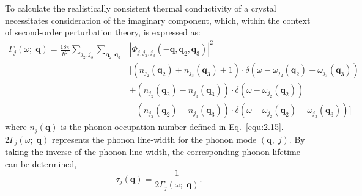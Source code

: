 To calculate the realistically consistent thermal conductivity of a crystal necessitates consideration of the imaginary component, which, within the context of second-order perturbation theory, is expressed as:
\begin{equation}
\label{equ:2.21}
    \begin{split}
        \Gamma_{j}(\omega;\;\mathbf{q}) = \frac{18\pi}{\hbar^{2}}\sum_{j_{2},j_{3}} \sum_{\mathbf{q}_{2},\mathbf{q}_{3}}&\left|\Phi_{j,j_{2},j_{3}}(-\mathbf{q}, \mathbf{q}_{2}, \mathbf{q}_{3}) \right|^{2}\\
        &\bigg[\left(n_{j_{2}}(\mathbf{q}_{2})+n_{j_{3}}(\mathbf{q}_{3})+1\right)\cdot\delta\left(\omega-\omega_{j_{2}}(\mathbf{q}_{2})-\omega_{j_{3}}(\mathbf{q}_{3})\right)\\
        &+\left(n_{j_{2}}(\mathbf{q}_{2})-n_{j_{3}}(\mathbf{q}_{3})\right)\cdot\delta\left(\omega-\omega_{j_{2}}(\mathbf{q}_{2})\right)\\
        &-\left(n_{j_{2}}(\mathbf{q}_{2})-n_{j_{3}}(\mathbf{q}_{3})\right)\cdot\delta\left(\omega-\omega_{j_{2}}(\mathbf{q}_{2})-\omega_{j_{3}}(\mathbf{q}_{3})\right)\bigg]
    \end{split}
\end{equation}
where $n_{j}(\mathbf{q})$ is the phonon occupation number defined in Eq.~\eqref{equ:2.15}.
$2\Gamma_{j}(\omega;\;\mathbf{q})$ represents the phonon line-width for the phonon mode $(\mathbf{q},\;j)$.
By taking the inverse of the phonon line-width, the corresponding phonon lifetime can be determined,
\begin{equation}
\label{equ:2.22}
       \tau_{j}(\mathbf{q}) = \frac{1}{2\Gamma_{j}(\omega;\;\mathbf{q})}.
\end{equation}




